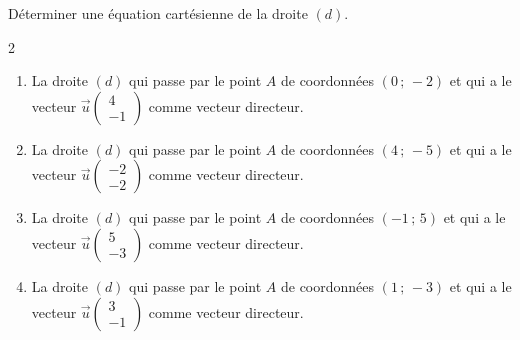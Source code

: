 {%
\begin{Exercice}
Déterminer une équation cartésienne de la droite $(d)$.
\vspace{-0.5cm}
\begin{multicols}{2}
\begin{enumerate}[itemsep=1em]
\item \begin{minipage}[t]{\linewidth} La droite $(d)$ qui passe par le point $A$ de coordonnées $(0\,;\,-2)$ et qui a le vecteur $\vec u \begin{pmatrix}4\\-1\end{pmatrix}$ comme vecteur directeur.\end{minipage}
	\item \begin{minipage}[t]{\linewidth} La droite $(d)$ qui passe par le point $A$ de coordonnées $(4\,;\,-5)$ et qui a le vecteur $\vec u \begin{pmatrix}-2\\-2\end{pmatrix}$ comme vecteur directeur.\end{minipage}
	\item \begin{minipage}[t]{\linewidth} La droite $(d)$ qui passe par le point $A$ de coordonnées $(-1\,;\,5)$ et qui a le vecteur $\vec u \begin{pmatrix}5\\-3\end{pmatrix}$ comme vecteur directeur.\end{minipage}
	\item \begin{minipage}[t]{\linewidth} La droite $(d)$ qui passe par le point $A$ de coordonnées $(1\,;\,-3)$ et qui a le vecteur $\vec u \begin{pmatrix}3\\-1\end{pmatrix}$ comme vecteur directeur.\end{minipage}
\end{enumerate}
\end{multicols}
\end{Exercice}

}
